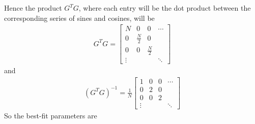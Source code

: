 Hence the product $G^TG$, where each entry will be the dot product between the corresponding series of sines and cosines, will be
\begin{align}
G^TG =
\begin{bmatrix}
N & 0 & 0 & \cdots \\
0 & \frac{N}{2} & 0 & \\
0 & 0 & \frac{N}{2} & \\
\vdots & & & \ddots
\end{bmatrix}
\end{align}
and
\begin{align}
(G^TG)^{-1} = \frac{1}{N}
\begin{bmatrix}
1 & 0 & 0 & \cdots \\
0 & 2 & 0 & \\
0 & 0 & 2 & \\
\vdots & & & \ddots
\end{bmatrix}    
\end{align}
So the best-fit parameters are
